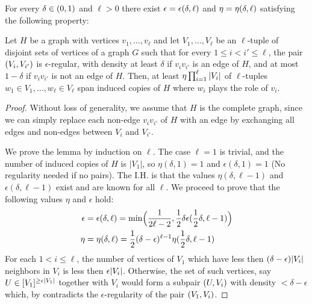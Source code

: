         \begin{lemma} \label{lem:H_like_partition_implies_H_abundance}
            For every $\delta \in ( 0, 1 )$ and $\ell > 0$ there exist $\epsilon = \epsilon ( \delta, \ell )$ and
            $\eta = \eta ( \delta, \ell )$ satisfying the following property:

            Let $H$ be a graph with vertices $v_1, \dots,v_\ell$ and let $V_1, \dots, V_\ell$ be an $\ell$-tuple of disjoint
            sets of vertices of a graph $G$ such that for every $1 \leq i < i' \leq \ell$, the pair $( V_i, V_{i'} )$
            is $\epsilon$-regular, with density at least $\delta$ if $v_i v_{i'}$ is an edge of $H$, and at most $1 - \delta$
            if $v_i v_{i'}$ is not an edge of $H$.
            Then, at least $\eta \prod_{i=1}^\ell | V_i |$ of $\ell$-tuples $w_1 \in V_1, \dots, w_\ell \in V_\ell$
            span induced copies of $H$ where $w_i$ plays the role of $v_i$.
            \begin{proof}
                Without loss of generality, we assume that $H$ is the complete graph, since we can simply replace each non-edge
                $v_i v_{i'}$ of $H$ with an edge by exchanging all edges and non-edges between $V_i$ and $V_{i'}$.

                We prove the lemma by induction on $\ell$.
                The case $\ell=1$ is trivial, and the number of induced copies of $H$ is $|V_1|$, so $\eta(\delta, 1) = 1$ and
                $\epsilon(\delta, 1) = 1$ (No regularity needed if no pairs).
                The I.H. is that the values $\eta(\delta, \ell-1)$ and $\epsilon(\delta, \ell-1)$ exist and are known for all
                $\ell$.
                We proceed to prove that the following values $\eta$ and $\epsilon$ hold:
                \begin{align*}
                    \epsilon &= \epsilon(\delta, \ell)
                        = \min \Bigl( \frac{1}{2\ell - 2}, \frac{1}{2} \delta \epsilon(\frac{1}{2}\delta, \ell-1) \Bigr) \\
                    \eta &= \eta(\delta, \ell)
                        = \frac{1}{2} (\delta - \epsilon)^{\ell-1} \eta(\frac{1}{2}\delta, \ell-1)
                \end{align*}
                For each $1 < i \leq \ell$, the number of vertices of $V_1$ which have less then
                $(\delta - \epsilon) | V_i |$ neighbors in $V_i$ is less then $\epsilon | V_i |$.
                Otherwise, the set of such vertices, say $U \in [V_1]^{\geq \epsilon | V_1 |}$ together with $V_i$
                would form a subpair $( U, V_i )$ with density $< \delta - \epsilon$ which, by
                 contradicts the $\epsilon$-regularity of the pair $( V_1, V_i )$.


\end{proof}
\end{lemma}

